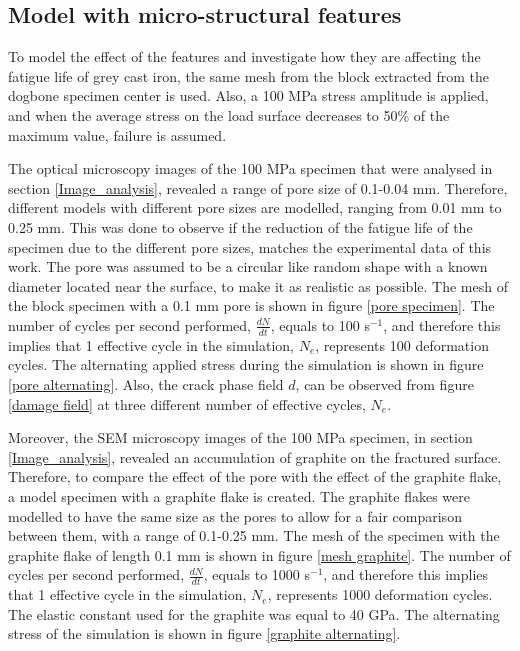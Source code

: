\documentclass[11pt,a4paper]{article}
\begin{document}
\subsection{Model with micro-structural features}
To model the effect of the features and investigate how they are affecting the fatigue life of grey cast iron, the same mesh from the block extracted from the dogbone specimen center is used. Also, a 100 MPa stress amplitude is applied, and when the average stress on the load surface decreases to 50\% of the maximum value, failure is assumed.

\noindent The optical microscopy images of the 100 MPa specimen that were analysed in section \ref{Image_analysis}, revealed a range of pore size of 0.1-0.04 mm. Therefore, different models with different pore sizes are modelled, ranging from 0.01 mm to 0.25 mm. This was done to observe if the reduction of the fatigue life of the specimen due to the different pore sizes, matches the experimental data of this work. The pore was assumed to be a circular like random shape with a known diameter located near the surface, to make it as realistic as possible. The mesh of the block specimen with a 0.1 mm pore is shown in figure \ref{pore specimen}. The number of cycles per second performed, $\frac{dN}{dt}$, equals to 100 s$^{-1}$, and therefore this implies that 1 effective cycle in the simulation, $N_e$, represents 100 deformation cycles. The alternating applied stress during the simulation is shown in figure \ref{pore alternating}. Also, the crack phase field $d$, can be observed from figure \ref{damage field} at three different number of effective cycles, $N_e$.

\noindent Moreover, the SEM microscopy images of the 100 MPa specimen, in section \ref{Image_analysis}, revealed an accumulation of graphite on the fractured surface. Therefore, to compare the effect of the pore with the effect of the graphite flake, a model specimen with a graphite flake is created. The graphite flakes were modelled to have the same size as the pores to allow for a fair comparison between them, with a range of 0.1-0.25 mm. The mesh of the specimen with the graphite flake of length 0.1 mm is shown in figure \ref{mesh graphite}. The number of cycles per second performed, $\frac{dN}{dt}$, equals to 1000 s$^{-1}$, and therefore this implies that 1 effective cycle in the simulation, $N_e$, represents 1000 deformation cycles. The elastic constant used for the graphite was equal to 40 GPa. The alternating stress of the simulation is shown in figure \ref{graphite alternating}.
\end{document}
